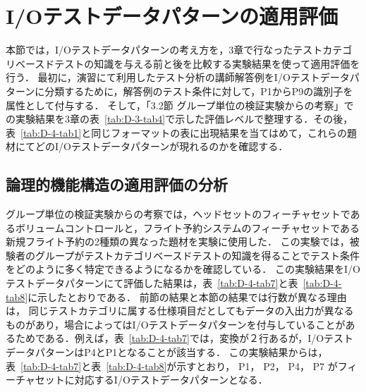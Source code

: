 \newpage
\section{I/Oテストデータパターンの適用評価}
本節では，I/Oテストデータパターンの考え方を，3章で行なったテストカテゴリベースドテストの知識を与える前と後を比較する実験結果を使って適用評価を行う．
最初に，演習にて利用したテスト分析の講師解答例をI/Oテストデータパターンに分類するために，解答例のテスト条件に対して，P1からP9の識別子を属性として付与する．
そして，「3.2節 グループ単位の検証実験からの考察」での実験結果を3章の表~\ref{tab:D-3-tab4}で示した評価レベルで整理する．その後，表~\ref{tab:D-4-tab1}と同じフォーマットの表に出現結果を当てはめて，これらの題材にてどのI/Oテストデータパターンが現れるのかを確認する．

\subsection{論理的機能構造の適用評価の分析}
グループ単位の検証実験からの考察では，ヘッドセットのフィーチャセットであるボリュームコントロールと，フライト予約システムのフィーチャセットである新規フライト予約の2種類の異なった題材を実験に使用した．
この実験では，被験者のグループがテストカテゴリベースドテストの知識を得ることでテスト条件をどのように多く特定できるようになるかを確認している．
この実験結果をI/Oテストデータパターンにて評価した結果は，表~\ref{tab:D-4-tab7}と表~\ref{tab:D-4-tab8}に示したとおりである．
前節の結果と本節の結果では行数が異なる理由は， 同じテストカテゴリに属する仕様項目だとしてもデータの入出力が異なるものがあり，場合によってはI/Oテストデータパターンを付与していることがあるためである．例えば，表~\ref{tab:D-4-tab7}では，変換が２行あるが，I/OテストデータパターンはP4とP1となることが該当する．
この実験結果からは，表~\ref{tab:D-4-tab7}と表~\ref{tab:D-4-tab8}が示すとおり， P1， P2， P4， P7 がフィーチャセットに対応するI/Oテストデータパターンとなる．

